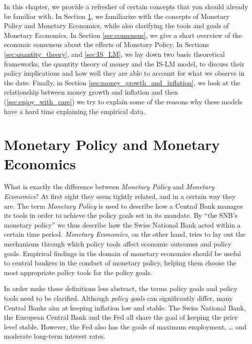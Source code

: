 \documentclass[11pt,a4paper,oneside]{book}
\begin{document}
In this chapter, we provide a refresher of certain concepts that you should already be familiar with. In Section \ref{sec:monetary_policy_and_monetary_economics}, we familiarize with the concepts of Monetary Policy and Monetary Economics, while also clarifying the tools and goals of Monetary Economics. In Section \ref{sec:consensus}, we give a short overview of the economic consensus about the effects of Monetary Policy. In Sections \ref{sec:quantity_theory}, and \ref{sec:IS_LM}, we lay down two basic theoretical frameworks, the quantity theory of money and the IS-LM model, to discuss their policy implications and how well they are able to account for what we observe in the date. Finally, in Section \ref{sec:money_growth_and_inflation}, we look at the relationship between money growth and inflation and then (\ref{sec:enjoy_with_care}) we try to explain some of the reasons why these models have a hard time explaining the empirical data.

\section{Monetary Policy and Monetary Economics}
\label{sec:monetary_policy_and_monetary_economics}

What is exactly the difference between \textit{Monetary Policy} and \textit{Monetary Economics}? At first sight they seem tightly related, and in a certain way they are. The term \textit{Monetary Policy} is used to describe how a Central Bank manages its tools in order to achieve the policy goals set in its mandate. By “the SNB’s monetary policy” we thus describe how the Swiss National Bank acted within a certain time period. \textit{Monetary Economics}, on the other hand, tries to lay out the mechanisms through which policy tools affect economic outcomes and policy goals. Empirical findings in the domain of monetary economics should be useful to central bankers in the conduct of monetary policy, helping them choose the most appropriate policy tools for the policy goals.

In order make these definitions less abstract, the terms policy goals and policy tools need to be clarified. Although \textit{policy goals} can significantly differ, many Central Banks aim at keeping inflation low and stable. The Swiss National Bank, the European Central Bank and the Fed all share the goal of keeping the price level stable. However, the Fed also has the goals of maximum employment, … and moderate long-term interest rates.
\end{document}
